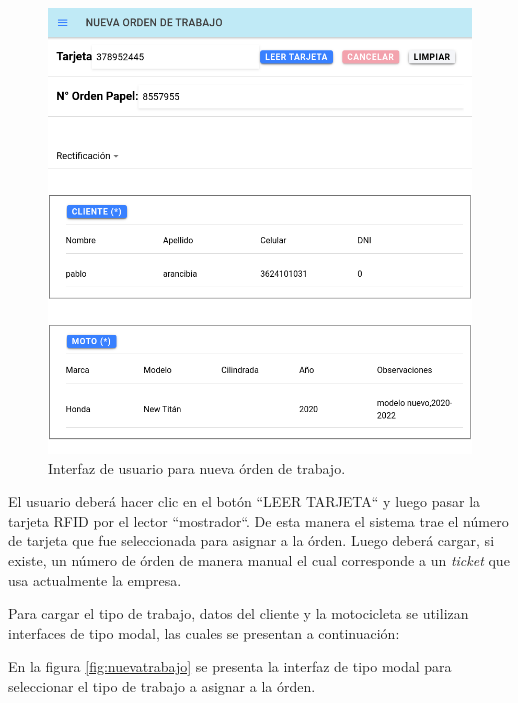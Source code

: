 \begin{figure}[H]
	\centering
	\includegraphics[scale=.30]{./Figures/nueva-full-1.png}
	\caption{Interfaz de usuario para nueva órden de trabajo.}
	\label{fig:nuevafull1}
\end{figure}


El usuario deberá hacer clic en el botón ``LEER TARJETA`` y luego pasar la tarjeta RFID por el lector ``mostrador``. De esta manera el sistema trae el número de tarjeta que fue seleccionada para asignar a la órden. Luego deberá cargar, si existe, un número de órden de manera manual el cual corresponde a un \textit{ticket} que usa actualmente la empresa.

Para cargar el tipo de trabajo, datos del cliente y la motocicleta se utilizan interfaces de tipo modal, las cuales se presentan a continuación:

En la figura \ref{fig:nuevatrabajo} se presenta la interfaz de tipo modal para seleccionar el tipo de trabajo a asignar a la órden.

